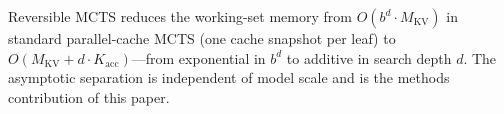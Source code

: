 Reversible MCTS reduces the working-set memory from $O(b^d \cdot M_{\text{KV}})$ in standard parallel-cache MCTS (one cache snapshot per leaf) to $O(M_{\text{KV}} + d \cdot K_{\text{acc}})$---from exponential in $b^d$ to additive in search depth $d$. The asymptotic separation is independent of model scale and is the methods contribution of this paper.
